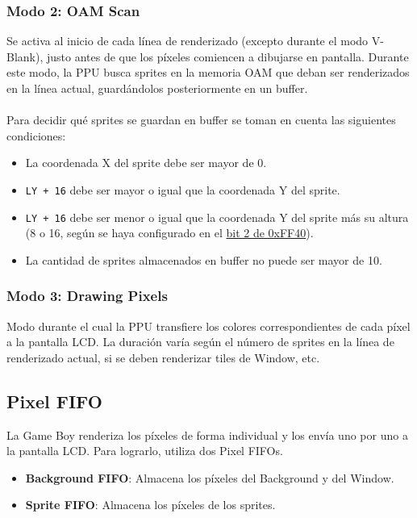 \subsubsection{Modo 2: OAM Scan}
Se activa al inicio de cada línea de renderizado (excepto durante el modo V-Blank), justo antes de que los píxeles comiencen a dibujarse en pantalla. Durante este modo, la PPU busca sprites en la memoria OAM que deban ser renderizados en la línea actual, guardándolos posteriormente en un buffer.
\\\\
Para decidir qué sprites se guardan en buffer se toman en cuenta las siguientes condiciones:
\begin{itemize}
    \item La coordenada X del sprite debe ser mayor de 0.
    \item \texttt{LY + 16} debe ser mayor o igual que la coordenada Y del sprite.
    \item \texttt{LY + 16} debe ser menor o igual que la coordenada Y del sprite más su altura (8 o 16, según se haya configurado en el \hyperref[lcd_control]{bit 2 de 0xFF40}).
    \item La cantidad de sprites almacenados en buffer no puede ser mayor de 10.
\end{itemize}

\subsubsection{Modo 3: Drawing Pixels} \label{ppu:mode3}
Modo durante el cual la PPU transfiere los colores correspondientes de cada píxel a la pantalla LCD. La duración varía según el número de sprites en la línea de renderizado actual, si se deben renderizar tiles de Window, etc.

\subsection{Pixel FIFO}

La Game Boy renderiza los píxeles de forma individual y los envía uno por uno a la pantalla LCD. Para lograrlo, utiliza dos Pixel FIFOs.
\begin{itemize}
    \item \textbf{Background FIFO}: Almacena los píxeles del Background y del Window.
    \item \textbf{Sprite FIFO}: Almacena los píxeles de los sprites.
\end{itemize}

